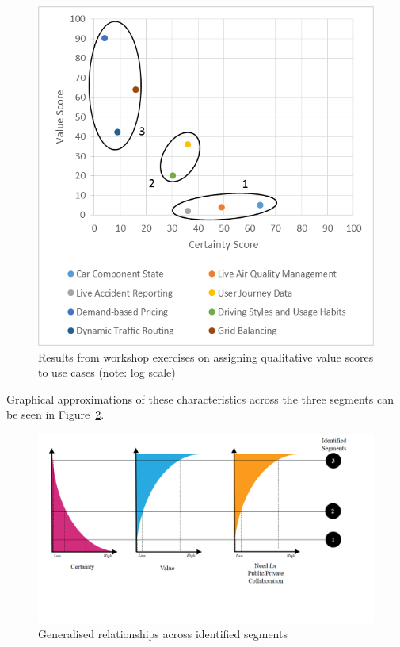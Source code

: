 \documentclass[journal]{IEEEtran}
\begin{document}
\begin{figure}[!htb]
\centering
\includegraphics[width=\columnwidth]{images/valuegraph.png}
\caption{Results from workshop exercises on assigning qualitative
value scores to use cases (note: log scale)}
\label{fig:valuegraph}
\end{figure}

Graphical approximations of these characteristics across the three
segments can be seen in Figure~\ref{fig:segmentcharacteristics}.

\begin{figure}[!htb]
\centering
\includegraphics[width=\columnwidth]{images/segmentcharacteristics.png}
\caption{Generalised relationships across identified segments}
\label{fig:segmentcharacteristics}
\end{figure}
\end{document}

